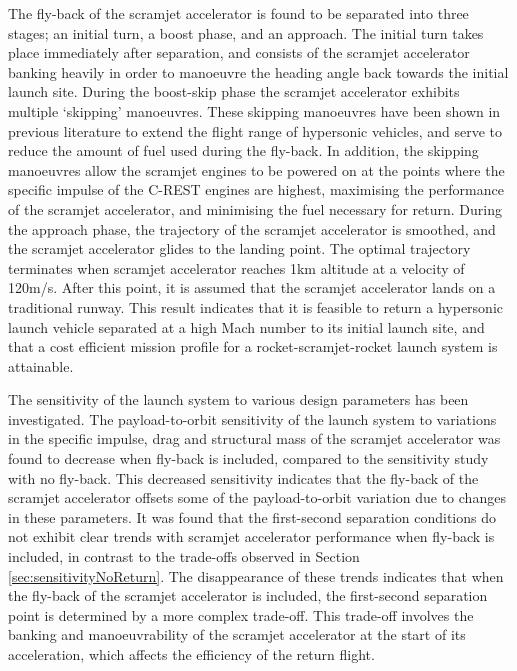 The fly-back of the scramjet accelerator is found to be separated into three stages; an initial turn, a boost phase, and an approach. 
The initial turn takes place immediately after separation, and consists of the scramjet accelerator banking heavily in order to manoeuvre the heading angle back towards the initial launch site. 
During the boost-skip phase the scramjet accelerator exhibits multiple `skipping' manoeuvres. These skipping manoeuvres have been shown in previous literature to extend the flight range of hypersonic vehicles\cite{Moshman2014,Darby2011,Toso2015,Tetlow1992,Eggers1957,Kanda2007,Chai2015}, and serve to reduce the amount of fuel used during the fly-back.
In addition, the skipping manoeuvres allow the scramjet engines to be powered on at the points where the specific impulse of the C-REST engines are highest, maximising the performance of the scramjet accelerator, and minimising the fuel necessary for return. 
During the approach phase, the trajectory of the scramjet accelerator is smoothed, and the scramjet accelerator glides to the landing point. 
 The optimal trajectory terminates when scramjet accelerator reaches 1km altitude at a velocity of 120m/s. After this point, it is assumed that the scramjet accelerator lands on a traditional runway.  
This result indicates that it is feasible to return a hypersonic launch vehicle separated at a high Mach number to its initial launch site, and that a cost efficient mission profile for a rocket-scramjet-rocket launch system is attainable.  

The sensitivity of the launch system to various design parameters has been investigated. 
The payload-to-orbit sensitivity of the launch system to variations in the specific impulse, drag and structural mass of the scramjet accelerator was found to decrease when fly-back is included, compared to the sensitivity study with no fly-back. This decreased sensitivity indicates that the fly-back of the scramjet accelerator offsets some of the payload-to-orbit variation due to changes in these parameters. 
It was found that the first-second separation conditions do not exhibit clear trends with scramjet accelerator performance when fly-back is included, in contrast to the trade-offs observed in Section \ref{sec:sensitivityNoReturn}. The disappearance of these trends indicates that when the fly-back of the scramjet accelerator is included, the first-second separation point is determined by a more complex trade-off. This trade-off involves the banking and manoeuvrability of the scramjet accelerator at the start of its acceleration, which affects the efficiency of the return flight. 
